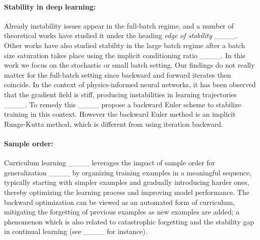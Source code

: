 \paragraph{Stability in deep learning:}
Already instability issues appear in the full-batch regime, and a number of theoretical works have studied it under the heading \emph{edge of stability} ____. Other works have also studied stability in the large batch regime after a batch size saturation takes place using the implicit conditioning ratio ____. In this work we focus on the stochastic or small batch setting. Our findings do not really matter for the full-batch setting since backward and forward iterates then coincide. In the context of physics-informed neural networks, it has been observed that the gradient field is stiff, producing instabilities in learning trajectories ____. To remedy this ____ propose a backward Euler scheme to stabilize training in this context. However the backward Euler method is an implicit Runge-Kutta method, which is different from using iteration backward.

\paragraph{Sample order:}
Curriculum learning ____ leverages the impact of sample order for generalization ____ by organizing training examples in a meaningful sequence, typically starting with simpler examples and gradually introducing harder ones, thereby optimizing the learning process and improving model performance. The backward optimization can be viewed as an automated form of curriculum, mitigating the forgetting of previous examples as new examples are added; a phenomenon which is also related to catastrophic forgetting and the stability gap in continual learning (see ____ for instance).